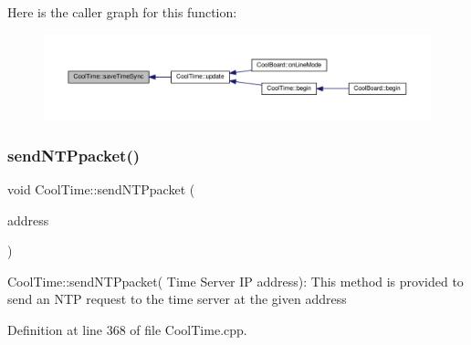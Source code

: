 Here is the caller graph for this function\+:\nopagebreak
\begin{figure}[H]
\begin{center}
\leavevmode
\includegraphics[width=350pt]{d6/d49/class_cool_time_ae9658c9b377510d469e3b88edf33ee85_icgraph}
\end{center}
\end{figure}
\mbox{\label{class_cool_time_a236a38d120dc53bc67456d763838c5a1}} 
\subsubsection{\texorpdfstring{send\+N\+T\+Ppacket()}{sendNTPpacket()}}
{\footnotesize\ttfamily void Cool\+Time\+::send\+N\+T\+Ppacket (\begin{DoxyParamCaption}\item[{I\+P\+Address \&}]{address }\end{DoxyParamCaption})}

Cool\+Time\+::send\+N\+T\+Ppacket( Time Server I\+P address)\+: This method is provided to send an N\+TP request to the time server at the given address 

Definition at line 368 of file Cool\+Time.\+cpp.


